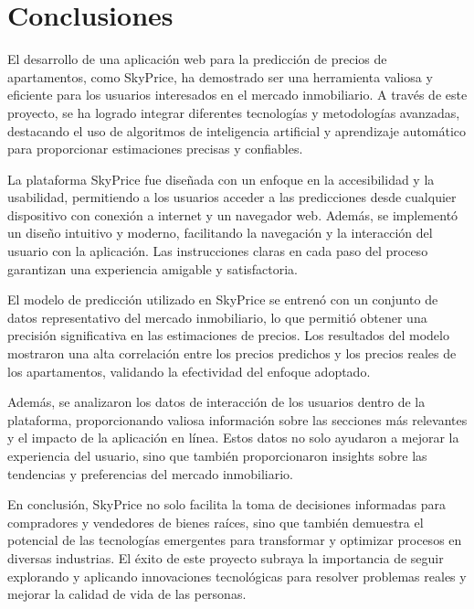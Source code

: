 \chapter{\textcolor{azulescom}{Conclusiones}}

El desarrollo de una aplicación web para la predicción de precios de
apartamentos, como SkyPrice, ha demostrado ser una herramienta valiosa y
eficiente para los usuarios interesados en el mercado inmobiliario. A través
de este proyecto, se ha logrado integrar diferentes tecnologías y metodologías
avanzadas, destacando el uso de algoritmos de inteligencia artificial y aprendizaje
automático para proporcionar estimaciones precisas y confiables.

La plataforma SkyPrice fue diseñada con un enfoque en la accesibilidad y la
usabilidad, permitiendo a los usuarios acceder a las predicciones desde cualquier
dispositivo con conexión a internet y un navegador web. Además, se implementó
un diseño intuitivo y moderno, facilitando la navegación y la interacción del
usuario con la aplicación. Las instrucciones claras en cada paso del proceso
garantizan una experiencia amigable y satisfactoria.

El modelo de predicción utilizado en SkyPrice se entrenó con un conjunto de
datos representativo del mercado inmobiliario, lo que permitió obtener una
precisión significativa en las estimaciones de precios. Los resultados del modelo
mostraron una alta correlación entre los precios predichos y los precios reales
de los apartamentos, validando la efectividad del enfoque adoptado.

Además, se analizaron los datos de interacción de los usuarios dentro de la
plataforma, proporcionando valiosa información sobre las secciones más relevantes
y el impacto de la aplicación en línea. Estos datos no solo ayudaron a mejorar
la experiencia del usuario, sino que también proporcionaron insights sobre las
tendencias y preferencias del mercado inmobiliario.

En conclusión, SkyPrice no solo facilita la toma de decisiones informadas para
compradores y vendedores de bienes raíces, sino que también demuestra el
potencial de las tecnologías emergentes para transformar y optimizar procesos
en diversas industrias. El éxito de este proyecto subraya la importancia de
seguir explorando y aplicando innovaciones tecnológicas para resolver problemas
reales y mejorar la calidad de vida de las personas.

